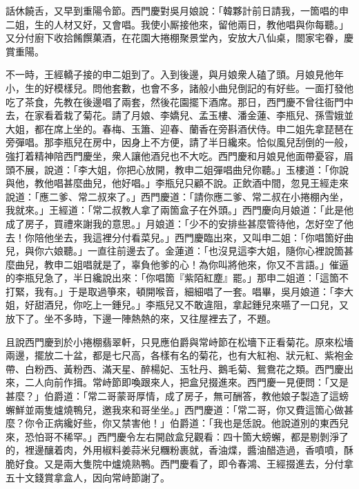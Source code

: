 話休饒舌，又早到重陽令節。西門慶對吳月娘說：「韓夥計前日請我，一箇唱的申二姐，生的人材又好，又會唱。我使小厮接他來，留他兩日，教他唱與你每聽。」又分付廚下收拾餚饌菓酒，在花園大捲棚聚景堂內，安放大八仙桌，閤家宅眷，慶賞重陽。

不一時，王經轎子接的申二姐到了。入到後邊，與月娘衆人磕了頭。月娘見他年小，生的好模樣兒。問他套數，也會不多，諸般小曲兒倒記的有好些。一面打發他吃了茶食，先教在後邊唱了兩套，然後花園擺下酒席。那日，西門慶不曾往衙門中去，在家看着栽了菊花。請了月娘、李嬌兒、孟玉樓、潘金蓮、李瓶兒、孫雪娥並大姐，都在席上坐的。春梅、玉簫、迎春、蘭香在旁斟酒伏侍。申二姐先拿琵琶在旁彈唱。那李瓶兒在房中，因身上不方便，請了半日纔來。恰似風兒刮倒的一般，強打着精神陪西門慶坐，衆人讓他酒兒也不大吃。西門慶和月娘見他面帶憂容，眉頭不展，說道：「李大姐，你把心放開，教申二姐彈唱曲兒你聽。」玉樓道：「你說與他，教他唱甚麼曲兒，他好唱。」李瓶兒只顧不說。正飲酒中間，忽見王經走來說道：「應二爹、常二叔來了。」西門慶道：「請你應二爹、常二叔在小捲棚內坐，我就來。」王經道：「常二叔教人拿了兩箇盒子在外頭。」西門慶向月娘道：「此是他成了房子，買禮來謝我的意思。」月娘道：「少不的安排些甚麼管待他，怎好空了他去！你陪他坐去，我這裡分付看菜兒。」{}西門慶臨出來，又叫申二姐：「你唱箇好曲兒，與你六娘聽。」一直往前邊去了。金蓮道：「也沒見這李大姐，隨你心裡說箇甚麼曲兒，教申二姐唱就是了，辜負他爹的心！為你叫將他來，你又不言語。」催逼的李瓶兒急了，半日纔說出來：「你唱箇『紫陌紅塵』罷。」那申二姐道：「這箇不打緊，我有。」于是取過箏來，頓開喉音，細細唱了一套。唱畢，吳月娘道：「李大姐，好甜酒兒，你吃上一鍾兒。」李瓶兒又不敢違阻，拿起鍾兒來嚥了一口兒，又放下了。坐不多時，下邊一陣熱熱的來，又往屋裡去了，不題。

且說西門慶到於小捲棚翡翠軒，只見應伯爵與常峙節在松墻下正看菊花。原來松墻兩邊，擺放二十盆，都是七尺高，各樣有名的菊花，{}也有大紅袍、狀元紅、紫袍金帶、白粉西、黃粉西、滿天星、醉楊妃、玉牡丹、鵝毛菊、鴛鴦花之類。西門慶出來，二人向前作揖。常峙節即喚跟來人，把盒兒掇進來。西門慶一見便問：「又是甚麼？」伯爵道：「常二哥蒙哥厚情，成了房子，無可酬答，教他娘子製造了這螃蠏鮮並兩隻爐燒鴨兒，邀我來和哥坐坐。」西門慶道：「常二哥，你又費這箇心做甚麼？你令正病纔好些，你又禁害他！」伯爵道：「我也是恁說。他說道別的東西兒來，恐怕哥不稀罕。」西門慶令左右開啟盒兒觀看：四十箇大螃蠏，都是剔剝淨了的，裡邊釀着肉，外用椒料姜蒜米兒糰粉裹就，香油煠，醬油醋造過，香噴噴，酥脆好食。又是兩大隻院中爐燒熟鴨。西門慶看了，即令春鴻、王經掇進去，分付拿五十文錢賞拿盒人，因向常峙節謝了。

